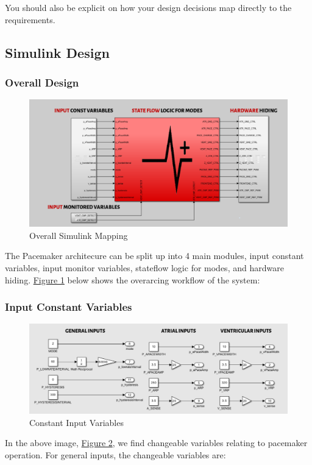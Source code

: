 \documentclass{article}
\begin{document}
You should also be explicit on how your design decisions map directly to the requirements.

\newpage
\subsection{Simulink Design}

\subsubsection{Overall Design}

\begin{tcolorbox}
    \begin{figure}[H]
        \includegraphics[width=\textwidth]{SimWholeView.png}
        \caption{Overall Simulink Mapping}
        \label{SimWholeView}
    \end{figure}
\end{tcolorbox}
The Pacemaker architecure can be split up into 4 main modules, input constant variables, 
input monitor variables, stateflow logic for modes, and hardware hiding. \hyperref[SimWholeView]{Figure 1} below shows the overarcing 
workflow of the system:

\newpage
\subsubsection{Input Constant Variables}

\begin{tcolorbox}
    \begin{figure}[H]
        \includegraphics[width=\textwidth]{ConstIn.png}
        \caption{Constant Input Variables}
        \label{ConstIn}
    \end{figure}
\end{tcolorbox}
In the above image, \hyperref[ConstIn]{Figure 2}, we find changeable variables 
relating to pacemaker operation. For general inputs, the changeable variables are:
\end{document}
